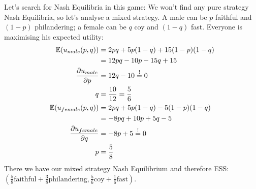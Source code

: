 \documentclass{article}
\newcommand{\E}{\mathbb{E}}
\begin{document}
	Let's search for Nash Equilibria in this game: We won't find any pure strategy Nash Equilibria, so let's analyse a mixed strategy. A male can be $p$ faithful and $(1-p)$ philandering; a female can be $q$ coy and $(1-q)$ fast. Everyone is maximising his expected utility:
	\begin{align}
		\E(u_{male}(p,q)) &= 2pq + 5p(1-q) + 15(1-p)(1-q) \notag \\
		&= 12pq - 10p - 15q + 15 \notag \\
		\frac{\partial u_{male}}{\partial p} &= 12q - 10 \overset{!}{=} 0 \notag \\
		q &= \frac{10}{12} = \frac{5}{6} \notag \\
		\E(u_{female}(p,q)) &= 2pq + 5p(1-q) - 5(1-p)(1-q) \notag \\
		&= -8pq + 10p + 5q - 5 \notag \\
		\frac{\partial u_{female}}{\partial q} &= -8p + 5 \overset{!}{=} 0 \notag \\
		p &= \frac{5}{8} \notag
	\end{align}
	There we have our mixed strategy Nash Equilibrium and therefore ESS: $\left(\frac{5}{8}\text{faithful} + \frac{3}{8}\text{philandering}, \frac{5}{6}\text{coy} + \frac{1}{6}\text{fast}\right)$.
	
	\printbibliography
\end{document}
